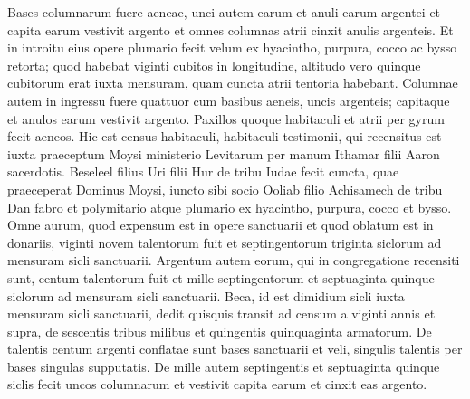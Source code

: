 \begin{biblechapter}
\begin{biblechapter}
\begin{biblechapter}
\begin{biblechapter}
\begin{biblechapter}
\begin{biblechapter}
\begin{biblechapter}
\begin{biblechapter}
\begin{biblechapter}
\begin{biblechapter}
\begin{biblechapter}
\begin{biblechapter}
\begin{biblechapter}
\begin{biblechapter}
\begin{biblechapter}
\begin{biblechapter}
\begin{biblechapter}
\begin{biblechapter}
\begin{biblechapter}
\begin{biblechapter}
\begin{biblechapter}
\begin{biblechapter}
\begin{biblechapter}
\begin{biblechapter}
\begin{biblechapter}
\begin{biblechapter}
\begin{biblechapter}
\begin{biblechapter}
\begin{biblechapter}
\begin{biblechapter}
\begin{biblechapter}
\begin{biblechapter}
\begin{biblechapter}
\begin{biblechapter}
\begin{biblechapter}
\begin{biblechapter}
\begin{biblechapter}
\begin{biblechapter}
\verse Bases columnarum fuere aeneae, unci autem earum et anuli earum argentei et capita earum vestivit argento et omnes columnas atrii cinxit anulis argenteis. 
\verse Et in introitu eius opere plumario fecit velum ex hyacintho, purpura, cocco ac bysso retorta; quod habebat viginti cubitos in longitudine, altitudo vero quinque cubitorum erat iuxta mensuram, quam cuncta atrii tentoria habebant. 
 \verse Columnae autem in ingressu fuere quattuor cum basibus aeneis, uncis argenteis; capitaque et anulos earum vestivit argento. 
\verse Paxillos quoque habitaculi et atrii per gyrum fecit aeneos.
 \verse Hic est census habitaculi, habitaculi testimonii, qui recensitus est iuxta praeceptum Moysi ministerio Levitarum per manum Ithamar filii Aaron sacerdotis. 
\verse Beseleel filius Uri filii Hur de tribu Iudae fecit cuncta, quae praeceperat Dominus Moysi, 
\verse iuncto sibi socio Ooliab filio Achisamech de tribu Dan fabro et polymitario atque plumario ex hyacintho, purpura, cocco et bysso.
 \verse Omne aurum, quod expensum est in opere sanctuarii et quod oblatum est in donariis, viginti novem talentorum fuit et septingentorum triginta siclorum ad mensuram sicli sanctuarii. 
\verse Argentum autem eorum, qui in congregatione recensiti sunt, centum talentorum fuit et mille septingentorum et septuaginta quinque siclorum ad mensuram sicli sanctuarii. 
\verse Beca, id est dimidium sicli iuxta mensuram sicli sanctuarii, dedit quisquis transit ad censum a viginti annis et supra, de sescentis tribus milibus et quingentis quinquaginta armatorum. 
\verse De talentis centum argenti conflatae sunt bases sanctuarii et veli, singulis talentis per bases singulas supputatis. 
\verse De mille autem septingentis et septuaginta quinque siclis fecit uncos columnarum et vestivit capita earum et cinxit eas argento. 

\end{biblechapter}
\end{biblechapter}
\end{biblechapter}
\end{biblechapter}
\end{biblechapter}
\end{biblechapter}
\end{biblechapter}
\end{biblechapter}
\end{biblechapter}
\end{biblechapter}
\end{biblechapter}
\end{biblechapter}
\end{biblechapter}
\end{biblechapter}
\end{biblechapter}
\end{biblechapter}
\end{biblechapter}
\end{biblechapter}
\end{biblechapter}
\end{biblechapter}
\end{biblechapter}
\end{biblechapter}
\end{biblechapter}
\end{biblechapter}
\end{biblechapter}
\end{biblechapter}
\end{biblechapter}
\end{biblechapter}
\end{biblechapter}
\end{biblechapter}
\end{biblechapter}
\end{biblechapter}
\end{biblechapter}
\end{biblechapter}
\end{biblechapter}
\end{biblechapter}
\end{biblechapter}
\end{biblechapter}
